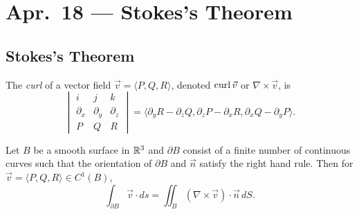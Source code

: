 \chapter{Apr.~18 --- Stokes's Theorem}

\section{Stokes's Theorem}

\begin{definition}
  The \emph{curl} of a vector field $\vec{v} = \langle P, Q, R \rangle$,
  denoted $\operatorname{curl} \vec{v}$ or $\nabla \times \vec{v}$, is
  \[
    \begin{vmatrix}
      i & j & k \\
      \partial_x & \partial_y & \partial_z \\
      P & Q & R
    \end{vmatrix}
    = \langle \partial_y R - \partial_z Q, \partial_z P - \partial_x R, \partial_x Q - \partial_y P \rangle.
  \]
\end{definition}

\begin{theorem}
  Let $B$ be a smooth surface in $\mathbb{R}^3$ and
  $\partial B$ consist of a finite number of continuous
  curves such that the orientation of $\partial B$
  and $\vec{n}$ satisfy the right hand rule.
  Then for $\vec{v} = \langle P, Q, R \rangle \in C^1(B)$,
  \[
    \int_{\partial B} \vec{v} \cdot ds
    = \iint_B (\nabla \times \vec{v}) \cdot \vec{n} \, dS.
  \]
\end{theorem}

